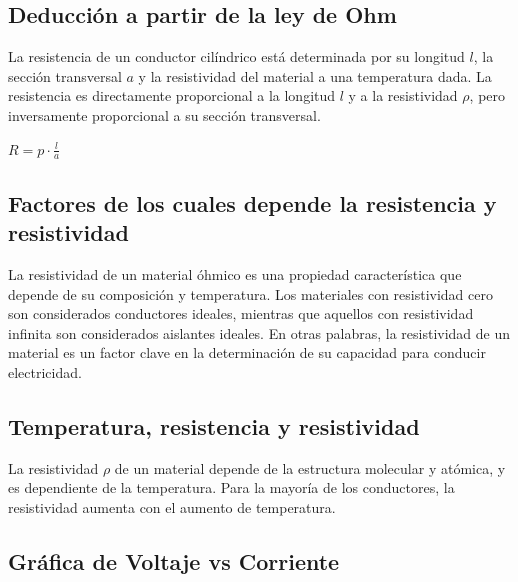\documentclass[10pt]{article}
\begin{document}
\begin{multicols}{2}
	\subsection*{Deducción a partir de la ley de Ohm}

	La resistencia de un conductor cilíndrico está determinada por su longitud $l$,
	la sección transversal $a$ y la resistividad del material a una temperatura dada.
	La resistencia es directamente proporcional a la longitud $l$ y a la
	resistividad $\rho$, pero inversamente proporcional a su sección transversal.

	$R = p \cdot \frac{l}{a}$

	\subsection*{Factores de los cuales depende la resistencia y resistividad}

	La resistividad de un material óhmico es una propiedad característica que
	depende de su composición y temperatura. Los materiales con resistividad
	cero son considerados conductores ideales, mientras que aquellos con
	resistividad infinita son considerados aislantes ideales. En otras
	palabras, la resistividad de un material es un factor clave en la
	determinación de su capacidad para conducir electricidad.

	\subsection*{Temperatura, resistencia y resistividad}

	La resistividad $\rho$ de un material depende de la estructura molecular y
	atómica, y es dependiente de la temperatura. Para la mayoría de los conductores,
	la resistividad aumenta con el aumento de temperatura.~\cite{KhanAcademy}

\end{multicols}

\subsection*{Gráfica de Voltaje vs Corriente}
\end{document}
